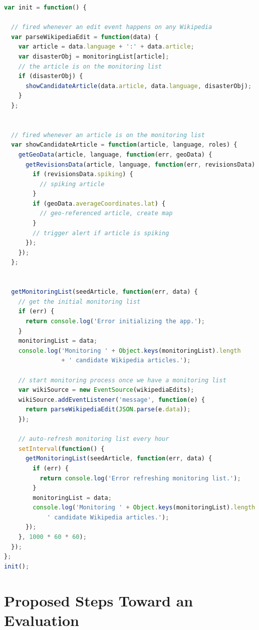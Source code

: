 \documentclass[letterpaper]{article}
\begin{document}
\begin{lstlisting}[caption={Monitoring loop of the natural disaster monitor},
  label=listing:monitoring, language=JavaScript,
  float=b!, stringstyle=\color{gray},morekeywords={for,if,console,log,addEventListener,JSON,parse,stringify,forEach}]
var init = function() {

  // fired whenever an edit event happens on any Wikipedia
  var parseWikipediaEdit = function(data) {
    var article = data.language + ':' + data.article;
    var disasterObj = monitoringList[article];
    // the article is on the monitoring list
    if (disasterObj) {    
      showCandidateArticle(data.article, data.language, disasterObj);
    }
  };
  

  // fired whenever an article is on the monitoring list
  var showCandidateArticle = function(article, language, roles) {
    getGeoData(article, language, function(err, geoData) {
      getRevisionsData(article, language, function(err, revisionsData) {
        if (revisionsData.spiking) {
          // spiking article
        }
        if (geoData.averageCoordinates.lat) {
          // geo-referenced article, create map
        }
        // trigger alert if article is spiking
      });
    });
  };  


  getMonitoringList(seedArticle, function(err, data) {
    // get the initial monitoring list
    if (err) {
      return console.log('Error initializing the app.');
    }
    monitoringList = data;
    console.log('Monitoring ' + Object.keys(monitoringList).length
                + ' candidate Wikipedia articles.');
    
    // start monitoring process once we have a monitoring list
    var wikiSource = new EventSource(wikipediaEdits);
    wikiSource.addEventListener('message', function(e) {
      return parseWikipediaEdit(JSON.parse(e.data));
    });
    
    // auto-refresh monitoring list every hour
    setInterval(function() {
      getMonitoringList(seedArticle, function(err, data) {
        if (err) {
          return console.log('Error refreshing monitoring list.');
        }
        monitoringList = data;
        console.log('Monitoring ' + Object.keys(monitoringList).length +
            ' candidate Wikipedia articles.');
      });
    }, 1000 * 60 * 60);
  });
};
init();
\end{lstlisting}

\section{Proposed Steps Toward an Evaluation}
\label{sec:Evaluation}
\end{document}
